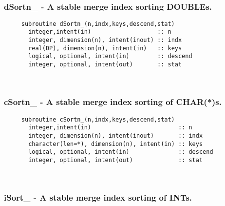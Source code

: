  
\mbox{}\hrulefill\ 
 

  \subsubsection{dSortn\_ - A stable merge index sorting DOUBLEs.}

\begin{verbatim} 
     subroutine dSortn_(n,indx,keys,descend,stat)
       integer,intent(in)                   :: n
       integer, dimension(n), intent(inout) :: indx
       real(DP), dimension(n), intent(in)   :: keys
       logical, optional, intent(in)        :: descend
       integer, optional, intent(out)       :: stat
 \end{verbatim}%
 
 
\mbox{}\hrulefill\ 
 

  \subsubsection{cSortn\_ - A stable merge index sorting of CHAR(*)s.}

\begin{verbatim} 
     subroutine cSortn_(n,indx,keys,descend,stat)
       integer,intent(in)                         :: n
       integer, dimension(n), intent(inout)       :: indx
       character(len=*), dimension(n), intent(in) :: keys
       logical, optional, intent(in)              :: descend
       integer, optional, intent(out)             :: stat
 \end{verbatim}%
 
 
\mbox{}\hrulefill\ 
 

  \subsubsection{iSort\_ - A stable merge index sorting of INTs.}

